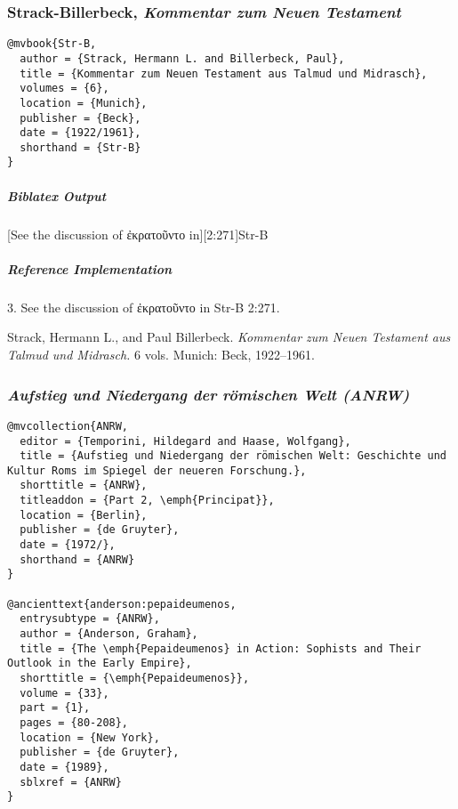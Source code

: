 \documentclass[a4paper]{article}
\newcommand{\gr}[1]{{\greekfont #1}}
\newenvironment{biboutput}{%
  \subparagraph{Biblatex Output}
}{\color{black}}
\newenvironment{refimp}{%
  \subparagraph{Reference Implementation}
  \color{reference-colour}
  \rm
}{\par\color{black}}
\begin{document}
\subsubsection{Strack-Billerbeck, \emph{Kommentar zum Neuen Testament}}

\begin{lstlisting}
@mvbook{Str-B,
  author = {Strack, Hermann L. and Billerbeck, Paul},
  title = {Kommentar zum Neuen Testament aus Talmud und Midrasch},
  volumes = {6},
  location = {Munich},
  publisher = {Beck},
  date = {1922/1961},
  shorthand = {Str-B}
}
\end{lstlisting}

\begin{biboutput}
  [See the discussion of \gr{ἐκρατοῦντο} in][2:271]{Str-B}
\end{biboutput}

\begin{refimp}
  3. See the discussion of \gr{ἐκρατοῦντο} in Str-B 2:271.

  \hangindent\bibindent Strack, Hermann L., and Paul Billerbeck.
  \emph{Kommentar zum Neuen Testament aus Talmud und Midrasch.} 6 vols.
  Munich: Beck, 1922–1961.

  \sloppy{}
\end{refimp}

\subsubsection{\emph{Aufstieg und Niedergang der römischen Welt (ANRW)}}

\begin{lstlisting}
@mvcollection{ANRW,
  editor = {Temporini, Hildegard and Haase, Wolfgang},
  title = {Aufstieg und Niedergang der römischen Welt: Geschichte und Kultur Roms im Spiegel der neueren Forschung.},
  shorttitle = {ANRW},
  titleaddon = {Part 2, \emph{Principat}},
  location = {Berlin},
  publisher = {de Gruyter},
  date = {1972/},
  shorthand = {ANRW}
}

@ancienttext{anderson:pepaideumenos,
  entrysubtype = {ANRW},
  author = {Anderson, Graham},
  title = {The \emph{Pepaideumenos} in Action: Sophists and Their Outlook in the Early Empire},
  shorttitle = {\emph{Pepaideumenos}},
  volume = {33},
  part = {1},
  pages = {80-208},
  location = {New York},
  publisher = {de Gruyter},
  date = {1989},
  sblxref = {ANRW}
}
\end{lstlisting}
\end{document}
